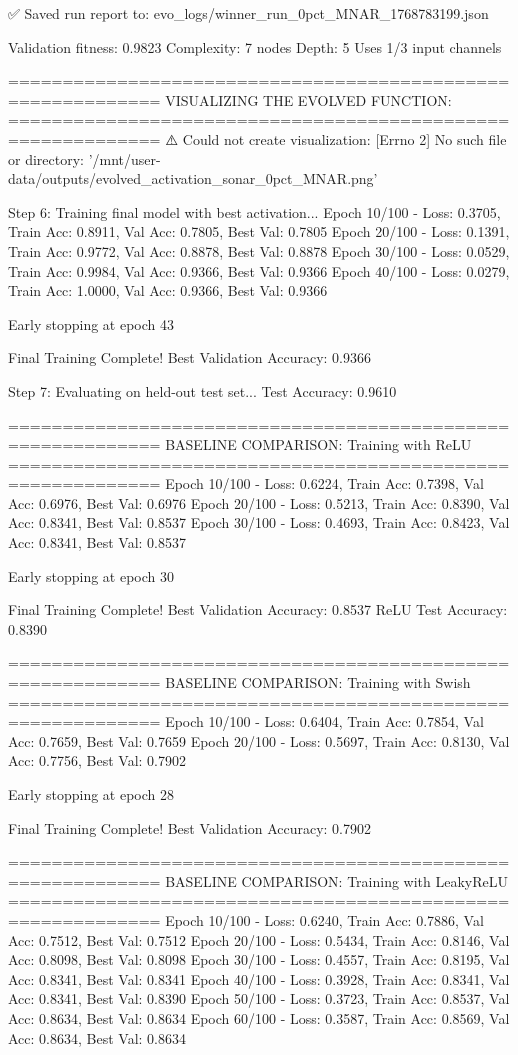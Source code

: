 ✅ Saved run report to: evo_logs/winner_run_0pct_MNAR_1768783199.json

Validation fitness: 0.9823
Complexity: 7 nodes
Depth: 5
Uses 1/3 input channels

============================================================
VISUALIZING THE EVOLVED FUNCTION:
============================================================
⚠️ Could not create visualization: [Errno 2] No such file or directory: '/mnt/user-data/outputs/evolved_activation_sonar_0pct_MNAR.png'

Step 6: Training final model with best activation...
Epoch  10/100 - Loss: 0.3705, Train Acc: 0.8911, Val Acc: 0.7805, Best Val: 0.7805
Epoch  20/100 - Loss: 0.1391, Train Acc: 0.9772, Val Acc: 0.8878, Best Val: 0.8878
Epoch  30/100 - Loss: 0.0529, Train Acc: 0.9984, Val Acc: 0.9366, Best Val: 0.9366
Epoch  40/100 - Loss: 0.0279, Train Acc: 1.0000, Val Acc: 0.9366, Best Val: 0.9366

Early stopping at epoch 43

Final Training Complete!
Best Validation Accuracy: 0.9366

Step 7: Evaluating on held-out test set...
Test Accuracy: 0.9610

============================================================
BASELINE COMPARISON: Training with ReLU
============================================================
Epoch  10/100 - Loss: 0.6224, Train Acc: 0.7398, Val Acc: 0.6976, Best Val: 0.6976
Epoch  20/100 - Loss: 0.5213, Train Acc: 0.8390, Val Acc: 0.8341, Best Val: 0.8537
Epoch  30/100 - Loss: 0.4693, Train Acc: 0.8423, Val Acc: 0.8341, Best Val: 0.8537

Early stopping at epoch 30

Final Training Complete!
Best Validation Accuracy: 0.8537
ReLU Test Accuracy: 0.8390

============================================================
BASELINE COMPARISON: Training with Swish
============================================================
Epoch  10/100 - Loss: 0.6404, Train Acc: 0.7854, Val Acc: 0.7659, Best Val: 0.7659
Epoch  20/100 - Loss: 0.5697, Train Acc: 0.8130, Val Acc: 0.7756, Best Val: 0.7902

Early stopping at epoch 28

Final Training Complete!
Best Validation Accuracy: 0.7902

============================================================
BASELINE COMPARISON: Training with LeakyReLU
============================================================
Epoch  10/100 - Loss: 0.6240, Train Acc: 0.7886, Val Acc: 0.7512, Best Val: 0.7512
Epoch  20/100 - Loss: 0.5434, Train Acc: 0.8146, Val Acc: 0.8098, Best Val: 0.8098
Epoch  30/100 - Loss: 0.4557, Train Acc: 0.8195, Val Acc: 0.8341, Best Val: 0.8341
Epoch  40/100 - Loss: 0.3928, Train Acc: 0.8341, Val Acc: 0.8341, Best Val: 0.8390
Epoch  50/100 - Loss: 0.3723, Train Acc: 0.8537, Val Acc: 0.8634, Best Val: 0.8634
Epoch  60/100 - Loss: 0.3587, Train Acc: 0.8569, Val Acc: 0.8634, Best Val: 0.8634

